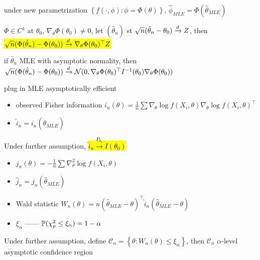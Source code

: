 \begin{fact}
    under new parametrization $\left\{ f(\cdot, \phi) : \phi = \Phi(\theta) \right\}$, $\hat \phi_{MLE} = \Phi (\hat \theta_{MLE})$
\end{fact}

\begin{thm}
    $\Phi \in C^1$ at $\theta_0$, $\nabla_\theta \Phi(\theta_0) \neq 0$, let $(\hat \theta_n)$ st $\sqrt{n}(\hat \theta_n - \theta_0) \xrightarrow{d} Z$, then\\
    \hl{$\sqrt{n} (\Phi(\hat \theta_n) - \Phi(\theta_0)) \xrightarrow{d} \nabla_\theta \Phi(\theta_0)^\top Z$}
\end{thm}

\begin{fact}
    if $\hat \theta_n$ MLE with asymptotic normality, then $\sqrt{n}(\Phi(\hat \theta_n) - \Phi(\theta_0)) \xrightarrow{d} \mathcal{N}(0, \nabla_\theta \Phi(\theta_0)^\top I^{-1}(\theta_0) \nabla_\theta \Phi(\theta_0))$
\end{fact}

\begin{fact}
    plug in MLE asymptotically efficient
\end{fact}

\begin{itemize}
    \item observed Fisher information $i_n(\theta) = \frac{1}{n}\sum \nabla_\theta \log f(X_i, \theta) \nabla_\theta \log f(X_i, \theta)^\top$
    \item $\hat i_n = i_n(\hat \theta_{MLE})$
\end{itemize}

\begin{prop}
    Under further assumption, \hl{$\hat i_n \xrightarrow{P_{\theta_0}} I(\theta_0)$}
\end{prop}

\begin{itemize}
    \item $j_n(\theta) = -\frac{1}{n} \sum \nabla^2_\theta \log f(X_i, \theta)$
    \item $\hat j_n = j_n(\hat \theta_{MLE})$
    \item Wald statistic $W_n(\theta) = n(\hat \theta_{MLE} - \theta)^\top \hat i_n (\hat \theta_{MLE} - \theta)$
    \item $\xi_\alpha$ ------ $\mathbb{P}(\chi_p^2 \leq \xi_\alpha) = 1 - \alpha$
\end{itemize}

\begin{prop}
    Under further assumption, define $\mathcal{C}_n = \left\{ \theta : W_n(\theta) \leq \xi_\alpha \right\}$, then $\mathcal{C}_n$ $\alpha$-level asymptotic confidence region
\end{prop}

